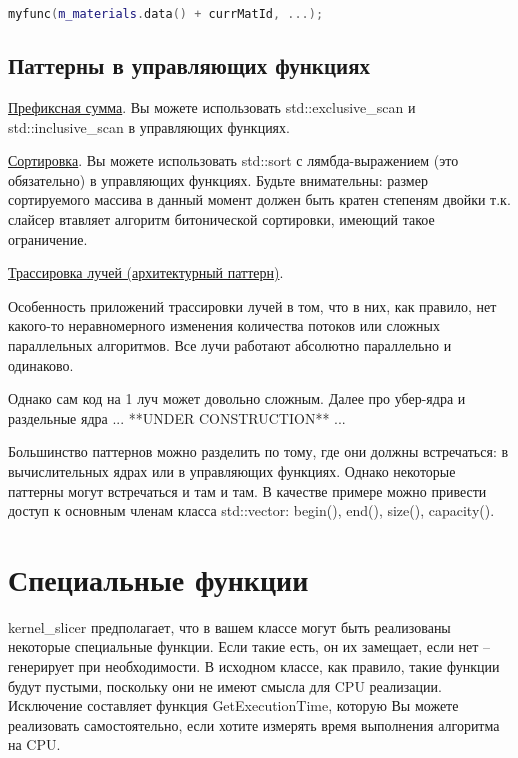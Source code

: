 \documentclass[11pt,fleqn,english,russian]{report} %
\begin{document}
\begin{lstlisting}[language=C++, 
	caption=ограниченная поддержка арифметики указателей, 
	label=lst:addptr]
  myfunc(m_materials.data() + currMatId, ...);
\end{lstlisting}

\section{Паттерны в управляющих функциях}

\noindent\underline{Префиксная сумма}. Вы можете использовать std::exclusive\_scan и std::inclusive\_scan в управляющих функциях.

\noindent\underline{Сортировка}. Вы можете использовать std::sort с лямбда-выражением (это обязательно) в управляющих функциях. Будьте внимательны: размер сортируемого массива в данный момент должен быть кратен степеням двойки т.к. слайсер втавляет алгоритм битонической сортировки, имеющий такое ограничение.

\noindent\underline{Трассировка лучей (архитектурный паттерн)}.

Особенность приложений трассировки лучей в том, что в них, как правило, нет какого-то неравномерного изменения количества потоков или сложных параллельных алгоритмов. Все лучи работают абсолютно параллельно и одинаково.

Однако сам код на 1 луч может довольно сложным. Далее про убер-ядра и раздельные ядра ... **UNDER CONSTRUCTION** ...  

\begin{remark}
Большинство паттернов можно разделить по тому, где они должны встречаться: в вычислительных ядрах или в управляющих функциях. Однако некоторые паттерны могут встречаться и там и там. В качестве примере можно привести доступ к основным членам класса std::vector: begin(), end(), size(), capacity().
\end{remark}

\chapter{Специальные функции}\label{spec_functions}

kernel\_slicer предполагает, что в вашем классе могут быть реализованы некоторые специальные функции. Если такие есть, он их замещает, если нет -- генерирует при необходимости. В исходном классе, как правило, такие функции будут пустыми, поскольку они не имеют смысла для CPU реализации. Исключение составляет функция GetExecutionTime, которую Вы можете реализовать самостоятельно, если хотите измерять время выполнения алгоритма на CPU.
\end{document}
